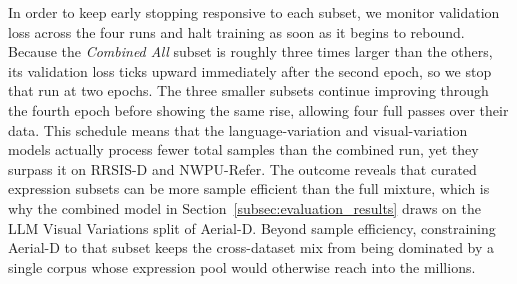 In order to keep early stopping responsive to each subset, we monitor validation loss across the four runs and halt training as soon as it begins to rebound. Because the \emph{Combined All} subset is roughly three times larger than the others, its validation loss ticks upward immediately after the second epoch, so we stop that run at two epochs. The three smaller subsets continue improving through the fourth epoch before showing the same rise, allowing four full passes over their data. This schedule means that the language-variation and visual-variation models actually process fewer total samples than the combined run, yet they surpass it on RRSIS-D and NWPU-Refer. The outcome reveals that curated expression subsets can be more sample efficient than the full mixture, which is why the combined model in Section~\ref{subsec:evaluation_results} draws on the LLM Visual Variations split of Aerial-D. Beyond sample efficiency, constraining Aerial-D to that subset keeps the cross-dataset mix from being dominated by a single corpus whose expression pool would otherwise reach into the millions.

\begin{table}[t]
\centering
\caption{Expression Enhancement Ablation Across Four Datasets}
\label{tab:ablation_expression_types}
\end{table}

